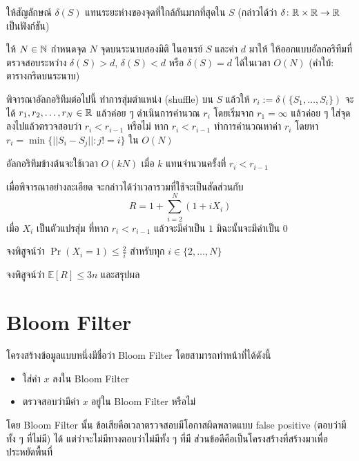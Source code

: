 \begin{definition}
ให้สัญลักษณ์ $\delta(S)$ แทนระยะห่างของจุดที่ใกล้กันมากที่สุดใน $S$ (กล่าวได้ว่า $\delta \colon \mathbb{R} \times \mathbb{R} \to \mathbb{R}$ เป็นฟังก์ชัน)
\end{definition}

\begin{exercise}
ให้ $N \in \mathbb{N}$ กำหนดจุด $N$ จุดบนระนาบสองมิติ ในอาเรย์ $S$ และค่า $d$ มาให้ ให้ออกแบบอัลกอริทึมที่ตรวจสอบระหว่าง $\delta(S) > d$, $\delta(S) < d$ หรือ $\delta(S) = d$ ได้ในเวลา $O(N)$ (คำใบ้: ตารางกริดบนระนาบ)
\end{exercise}

พิจารณาอัลกอริทึมต่อไปนี้ ทำการสุ่มตำแหน่ง (shuffle) บน $S$ แล้วให้ $r_i := \delta(\{S_1, \dots, S_i\})$ จะได้ $r_1, r_2, \dots, r_N \in \mathbb{R}$ แล้วค่อย ๆ ดำเนินการคำนวณ $r_i$ โดยเริ่มจาก $r_1 = \infty$ แล้วค่อย ๆ ใส่จุดลงไปแล้วตรวจสอบว่า $r_i < r_{i-1}$ หรือไม่ หาก $r_i < r_{i-1}$ ทำการคำนวณหาค่า $r_i$ โดยหา $r_i = \min\{||S_i - S_j|| \colon j != i\}$ ใน $O(N)$

อัลกอริทึมข้างต้นจะใช้เวลา $O(kN)$ เมื่อ $k$ แทนจำนวนครั้งที่ $r_i < r_{i-1}$

เมื่อพิจารณาอย่างละเอียด จะกล่าวได้ว่าเวลารวมที่ใช้จะเป็นสัดส่วนกับ
\[
R = 1 + \sum_{i=2}^N (1 + i X_i)
\]
เมื่อ $X_i$ เป็นตัวแปรสุ่ม ที่หาก $r_i < r_{i-1}$ แล้วจะมีค่าเป็น $1$ มิฉะนั้นจะมีค่าเป็น $0$

\begin{exercise}
จงพิสูจน์ว่า $\Pr(X_i = 1) \leq \frac{2}{i}$ สำหรับทุก $i \in \{2, \dots, N\}$
\end{exercise}

\begin{exercise}
จงพิสูจน์ว่า $\mathbb{E}[R] \leq 3n$ และสรุปผล
\end{exercise}

\section{Bloom Filter}

โครงสร้างข้อมูลแบบหนึ่งมีชื่อว่า Bloom Filter โดยสามารถทำหน้าที่ได้ดังนี้
\begin{itemize}[nosep]
    \item ใส่ค่า $x$ ลงใน Bloom Filter
    \item ตรวจสอบว่ามีค่า $x$ อยู่ใน Bloom Filter หรือไม่
\end{itemize}

โดย Bloom Filter นั้น ข้อเสียคือเวลาตรวจสอบมีโอกาสผิดพลาดแบบ false positive (ตอบว่ามีทั้ง ๆ ที่ไม่มี) ได้ แต่ว่าจะไม่มีทางตอบว่าไม่มีทั้ง ๆ ที่มี ส่วนข้อดีคือเป็นโครงสร้างที่สร้างมาเพื่อประหยัดพื้นที่

